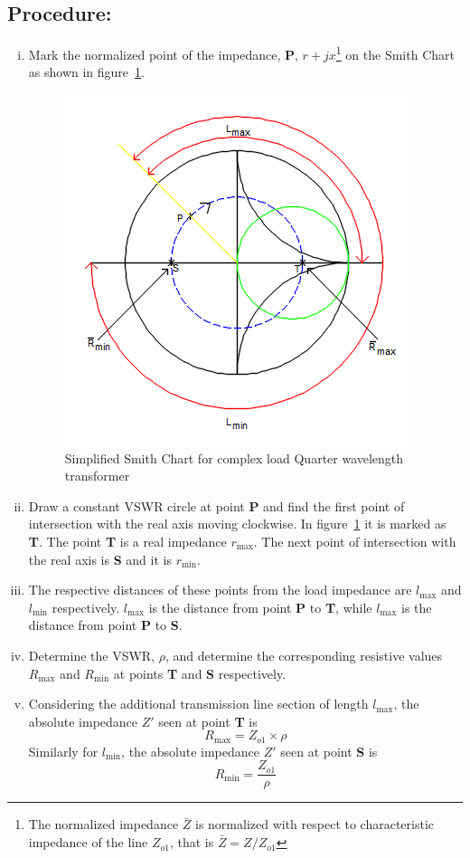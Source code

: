 \subsection*{Procedure:}
\begin{enumerate}[(i)]
\item Mark the normalized point of the impedance, \textbf{P}, $r + jx$\footnote{
The normalized impedance $ \bar{Z}$ is normalized with respect to characteristic impedance of the line $ Z_{o1}$, that is $ \bar{Z} = Z/ Z_{o1}$
} on the Smith Chart as shown in figure~\ref{fig:sinsmith}.
\begin{figure}[h]
\centering
\includegraphics[scale=0.6]{./graphics/sinsmith}
\caption{ Simplified Smith Chart for complex load Quarter wavelength transformer}
\label{fig:sinsmith}
\end{figure}

\item Draw a constant VSWR circle at point \textbf{P} and find the first point of intersection with the real axis moving clockwise. In figure~\ref{fig:sinsmith} it is marked as \textbf{T}. The point \textbf{T} is a real impedance $r_\max$. The next point of intersection with the real axis is \textbf{S} and it is $r_\min$.
\item The respective distances of these points from the load impedance are $ l_\max$ and $ l_\min$ respectively. $ l_\max$ is the distance from point \textbf{P} to \textbf{T}, while $ l_\max$ is the distance from point \textbf{P} to \textbf{S}.
\item Determine the VSWR, $\rho$, and determine the corresponding resistive values $R_\max$ and $R_\min$ at points \textbf{T} and \textbf{S} respectively. 
\item Considering the additional transmission line section of length $ l_\max$, the absolute impedance $ Z'$ seen at point \textbf{T} is
\begin{equation}
R_\max = Z_{o1}\times\rho
\end{equation}
Similarly for $ l_\min$, the absolute impedance $ Z'$ seen at point \textbf{S} is
\begin{equation}
R_\min = \frac{Z_{o1}}{\rho}
\end{equation}
\end{enumerate}
